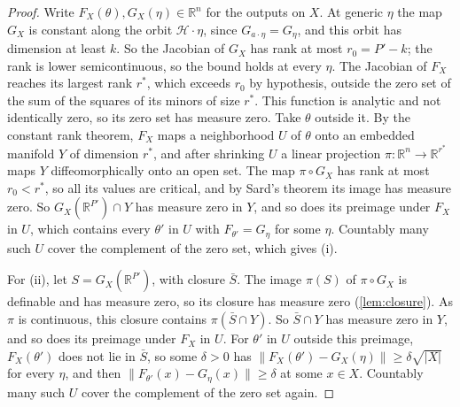 \documentclass[10pt]{article}
\theoremstyle{definition}
\theoremstyle{remark}
\newcommand{\R}{\mathbb{R}}
\newcommand{\norm}[1]{\lVert #1\rVert}
\begin{document}
\begin{proof}
Write $F_X(\theta), G_X(\eta) \in \R^n$ for the outputs on $X$. At generic $\eta$ the map $G_X$ is constant along the orbit $\mathcal H\cdot\eta$, since $G_{a\cdot\eta} = G_\eta$, and this orbit has dimension at least $k$. So the Jacobian of $G_X$ has rank at most $r_0 = P' - k$; the rank is lower semicontinuous, so the bound holds at every $\eta$. The Jacobian of $F_X$ reaches its largest rank $r^*$, which exceeds $r_0$ by hypothesis, outside the zero set of the sum of the squares of its minors of size $r^*$. This function is analytic and not identically zero, so its zero set has measure zero. Take $\theta$ outside it. By the constant rank theorem, $F_X$ maps a neighborhood $U$ of $\theta$ onto an embedded manifold $Y$ of dimension $r^*$, and after shrinking $U$ a linear projection $\pi : \R^n \to \R^{r^*}$ maps $Y$ diffeomorphically onto an open set. The map $\pi \circ G_X$ has rank at most $r_0 < r^*$, so all its values are critical, and by Sard's theorem its image has measure zero. So $G_X(\R^{P'}) \cap Y$ has measure zero in $Y$, and so does its preimage under $F_X$ in $U$, which contains every $\theta'$ in $U$ with $F_{\theta'} = G_\eta$ for some $\eta$. Countably many such $U$ cover the complement of the zero set, which gives (i).

For (ii), let $S = G_X(\R^{P'})$, with closure $\bar S$. The image $\pi(S)$ of $\pi \circ G_X$ is definable and has measure zero, so its closure has measure zero (\cref{lem:closure}). As $\pi$ is continuous, this closure contains $\pi(\bar S \cap Y)$. So $\bar S \cap Y$ has measure zero in $Y$, and so does its preimage under $F_X$ in $U$. For $\theta'$ in $U$ outside this preimage, $F_X(\theta')$ does not lie in $\bar S$, so some $\delta > 0$ has $\norm{F_X(\theta') - G_X(\eta)} \ge \delta\sqrt{\lvert X\rvert}$ for every $\eta$, and then $\norm{F_{\theta'}(x) - G_\eta(x)} \ge \delta$ at some $x \in X$. Countably many such $U$ cover the complement of the zero set again.
\end{proof}
\end{document}

